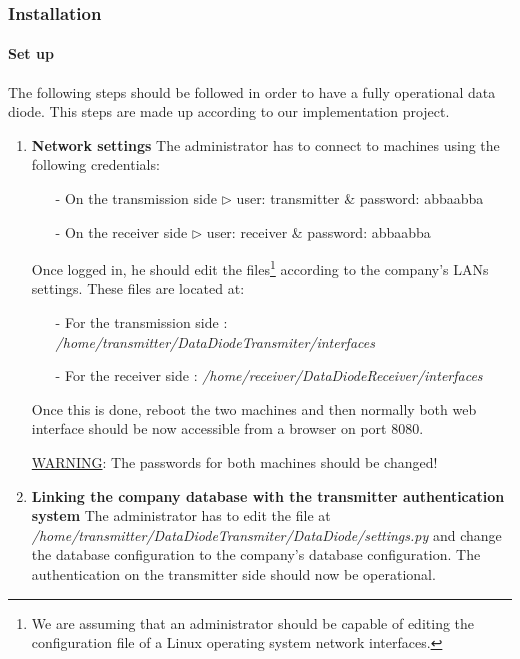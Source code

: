 \documentclass[a4paper,10pt]{article}
\begin{document}
\subsubsection{Installation}
\paragraph{Set up}
The following steps should be followed in order to have a fully operational data diode. This steps are made up according to our implementation project.


\begin{enumerate}
\item \textbf{Network settings} The administrator has to connect to machines using the following credentials:
	
\begin{enumerate}
\item[-]On the transmission side $\triangleright$ user: transmitter \& password: abbaabba
\item[-]On the receiver side $\triangleright$ user: receiver \& password: abbaabba
\end{enumerate}
 
Once logged in, he should edit the files\footnote{We are assuming that an administrator should be capable of editing the configuration file of a Linux operating system network interfaces.} according to the company's LANs settings. These files are located at:
\begin{enumerate}
\item[-] For the transmission side : \emph{/home/transmitter/DataDiodeTransmiter/interfaces}
\item[-] For the receiver side : \emph{/home/receiver/DataDiodeReceiver/interfaces}
\end{enumerate}

Once this is done, reboot the two machines and then normally both web interface should be now accessible from a browser on port 8080.

\underline{WARNING}: The passwords for both machines should be changed!

\item \textbf{Linking the company database with the transmitter authentication system} The administrator has to edit the file at \emph{/home/transmitter/DataDiodeTransmiter/DataDiode/settings.py} and change the database configuration to the company's database configuration. The authentication on the transmitter side should now be operational.


\end{enumerate}
\end{document}
